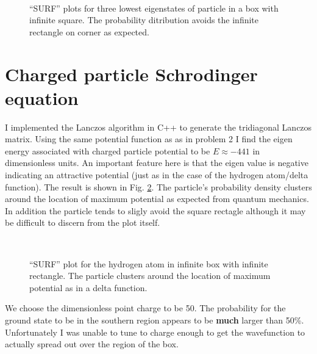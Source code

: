 \documentclass[singlepage,notitlepage,nofootinbib,11pt]{revtex4-1}
\begin{document}
\begin{figure}[h]
  \\
  \caption{\label{particles} ``SURF'' plots for three lowest eigenstates of particle in a box with infinite square. The probability ditribution avoids the infinite rectangle on corner as expected.}
\end{figure}

\clearpage
\section{Charged particle Schrodinger equation}
I implemented the Lanczos algorithm in C++ to generate the tridiagonal Lanczos matrix. Using the same potential function as as in problem 2 I find the eigen energy associated with charged particle potential to be $\boxed{E\approx-441}$ in dimensionless units. An important feature here is that the eigen value is negative indicating an attractive potential (just as in the case of the hydrogen atom/delta function). The result is shown in Fig. \ref{lanczos}. The particle's probability density clusters around the location of maximum potential as expected from quantum mechanics. In addition the particle tends to sligly avoid the square rectagle although it may be difficult to discern from the plot itself.
\begin{figure}[h]
  \centering
  \captionsetup[subfigure]{labelformat=empty}
  \\
\caption{\label{lanczos} ``SURF'' plot for the hydrogen atom in infinite box with infinite rectangle. The particle clusters around the location of maximum potential as in a delta function.}
\end{figure}
  We choose the dimensionless point charge to be 50. The probability for the ground state to be in the southern region appears to be {\bf much} larger than 50\%. Unfortunately I was unable to tune to charge enough to get the wavefunction to actually spread out over the region of the box.
\end{document}
